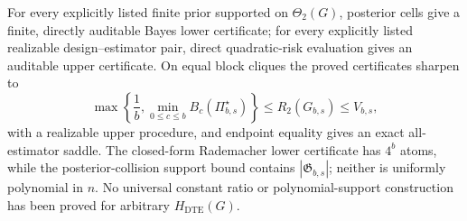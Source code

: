 For every explicitly listed finite prior supported on \(\Theta_2(G)\), posterior cells give a finite, directly auditable Bayes lower certificate; for every explicitly listed realizable design--estimator pair, direct quadratic-risk evaluation gives an auditable upper certificate. On equal block cliques the proved certificates sharpen to
\[
\max\left\{\frac1b,\min_{0\leq c\leq b}B_c(\Pi_{b,s}^{\star})\right\}
\leq R_2(G_{b,s})\leq V_{b,s},
\]
with a realizable upper procedure, and endpoint equality gives an exact all-estimator saddle. The closed-form Rademacher lower certificate has \(4^b\) atoms, while the posterior-collision support bound contains \(|\mathfrak G_{b,s}|\); neither is uniformly polynomial in \(n\). No universal constant ratio or polynomial-support construction has been proved for arbitrary \(H_{\mathrm{DTE}}(G)\).